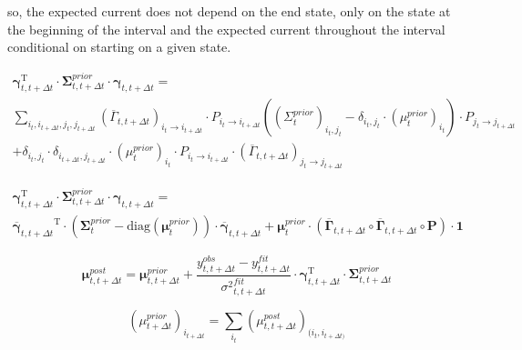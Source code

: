 \documentclass[pdflatex,sn-mathphys-num]{sn-jnl}%
\theoremstyle{thmstyleone}%
\theoremstyle{thmstyletwo}%
\theoremstyle{thmstylethree}%
\begin{document}
so, the expected current does not depend on the end state, only on the state at the beginning of the interval and the expected current throughout the interval conditional on starting on a given state. 

\begin{multline}
	{\mathbf \gamma}^{\mathrm{T}}_{t, t+\Delta t} \cdot \mathbf \Sigma^{prior}_{t, t+\Delta t} \cdot \mathbf \gamma_{t, t+\Delta t}= \\
	\sum_{i_t, i_{t +\Delta t},j_t, j_{t +\Delta t}}
	({\overline \Gamma_{t,t + \Delta t}})_{i_t \rightarrow i_{t+\Delta t}} \cdot 
	P_{i_t \rightarrow i_{t+ \Delta t}} \left((\Sigma^{prior}_{t})_{i_t ,j_t} - \delta_{i_t, j_t} \cdot (\mu^{prior}_t)_{i_t} \right)  \cdot P_{j_t \rightarrow j_{t+ \Delta t}} \\+\delta_{i_t, j_t} \cdot \delta_{i_{t+ \Delta t}, j_{t+ \Delta t}} \cdot (\mu^{prior}_t)_{i_t}\cdot P_{i_t \rightarrow i_{t+ \Delta t}} 
	\cdot 
	({\overline \Gamma_{t,t + \Delta t}})_{j_t \rightarrow j_{t+\Delta t}} 
\end{multline}

\begin{multline}
	{\mathbf \gamma}^{\mathrm{T}}_{t, t+\Delta t} \cdot \mathbf \Sigma^{prior}_{t, t+\Delta t} \cdot \mathbf \gamma_{t, t+\Delta t}= \\
	{\overline {\mathbf \gamma}_{t, t+\Delta t}}^\mathrm{T} \cdot 
	(\mathbf \Sigma^{prior}_{t} -\mathrm{diag}( \mathbf \mu^{prior}_t))\cdot  
	{\overline {\mathbf \gamma}_{t, t+\Delta t}}+ 
	\mathbf \mu^{prior}_t \cdot ( \overline {\mathbf \Gamma}_{t, t + \Delta t}  \circ  \overline {\mathbf \Gamma}_{t, t + \Delta t}  \circ \mathbf P ) \cdot \mathbf 1
\end{multline}

\begin{equation}
	\mathbf \mu^{post}_{t, t+ \Delta t}= \mathbf \mu^{prior}_{t, t+ \Delta t} + 
	{\frac {y^{obs}_{t, t+ \Delta t} - y^{fit}_{t, t+ \Delta t}}{{\sigma^2}^{fit}_{t, t+ \Delta t}} }
	\cdot {\mathbf \gamma}^\mathrm{T}_{t, t+ \Delta t} \cdot \mathbf \Sigma^{prior}_{t, t+ \Delta t} 
\end{equation}

\begin{equation}
	( \mu^{prior}_{t+ \Delta t})_{i_{t+\Delta t}} = \sum_{i_t} (\mu^{post}_{t, t+\Delta t})_{(i_t, i_{t+\Delta t)}}
\end{equation}
\begin{equation}
\end{equation}
\end{document}
